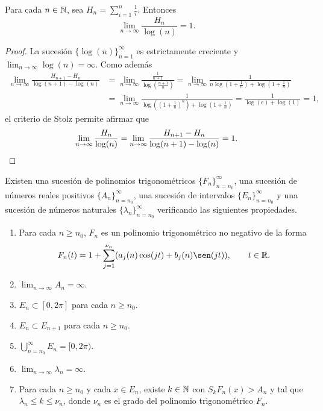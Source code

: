 \documentclass[a4paper, 12pt, oneside]{book}
\begin{document}
\begin{lemma}\label{2.2.12}
    Para cada $n \in \mathbb N$, sea $H_n = \sum_{i=1}^n \frac{1}{i}$. Entonces
    \[\lim_{n \to \infty} \frac{H_n}{\log(n)} = 1.\]
\end{lemma}

\begin{proof}
    La sucesión $\{\log(n)\}_{n=1}^\infty$ es estrictamente creciente y $\lim_{n\to\infty} \log(n) = \infty$. Como además
    \begin{align*}
        \lim_{n\to\infty}\frac{H_{n+1}-H_n}{\log(n+1)-\log(n)} &= \lim_{n\to\infty} \frac{\frac{1}{n+1}}{\log(\frac{n+1}{n})} = \lim_{n\to\infty}\frac{1}{n\log(1+\frac{1}{n})+\log(1+\frac{1}{n})} 
        \\ &= \lim_{n\to\infty}\frac{1}{\log((1+\frac{1}{n})^n)+\log(1+\frac{1}{n})} = \frac{1}{\log(e)+\log(1)} = 1,
    \end{align*}
    el criterio de Stolz permite afirmar que
    \[\lim_{n\to\infty}\frac{H_n}{\log(n)} = \lim_{n\to\infty}\frac{H_{n+1}-H_n}{\log(n+1)-\log(n)} = 1.\qedhere\]
\end{proof}

\begin{lemma}
    Existen una sucesión de polinomios trigonométricos $\{F_n\}_{n=n_0}^\infty$, una sucesión de números reales positivos $\{A_n\}_{n=n_0}^\infty$, una sucesión de intervalos $\{E_n\}_{n=n_0}^\infty$ y una sucesión de números naturales $\{\lambda_n\}_{n=n_0}^\infty$ verificando las siguientes propiedades.
    \begin{enumerate}
        \item Para cada $n \geq n_0$, $F_n$ es un polinomio trigonométrico no negativo de la forma
        \[F_n(t)=1+\sum_{j=1}^{\nu_n}(a_j(n)\cos(jt)+b_j(n)\sen(jt)), \qquad t \in \R.\]
        \item $\lim_{n \to \infty} A_n = \infty$.
        \item $E_n \subset [0,2\pi]$ para cada $n \geq n_0$.
        \item $E_n \subset E_{n+1}$ para cada $n \geq n_0$.
        \item $\bigcup_{n=n_0}^\infty E_n = [0,2\pi)$.
        \item $\lim_{n\to\infty} \lambda_n = \infty$.
        \item Para cada $n \geq n_0$ y cada $x \in E_n$, existe $k \in \mathbb N$ con $S_kF_n(x) > A_n$ y tal que $\lambda_n \leq k \leq \nu_n$, donde $\nu_n$ es el grado del polinomio trigonométrico $F_n$.
    \end{enumerate}
\end{lemma}
\end{document}
